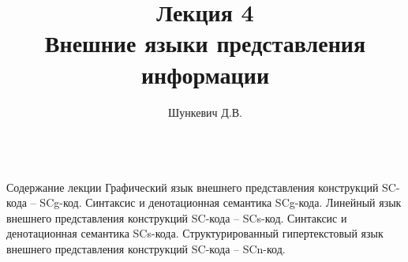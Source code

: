 \title{Лекция 4\\Внешние языки представления информации}   
\author[]{Шункевич Д.В.}

\begin{frame}
	\titlepage
\end{frame}

\begin{frame}{\\Содержание лекции}
	\topline
	\justifying
	Графический язык внешнего представления конструкций SC-кода – SCg-код. Синтаксис и денотационная семантика SCg-кода. Линейный язык внешнего представления конструкций SC-кода – SCs-код. Синтаксис и денотационная семантика SCs-кода. Структурированный гипертекстовый язык внешнего представления конструкций SC-кода – SCn-код.
\end{frame}